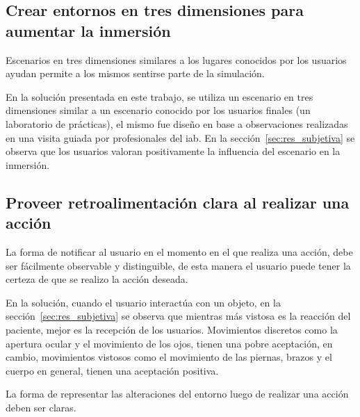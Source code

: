 \subsection{Crear entornos en tres dimensiones para aumentar la inmersión}

Escenarios en tres dimensiones similares a los lugares conocidos por los
usuarios ayudan permite a los mismos sentirse parte de la simulación. 

En la solución presentada en este trabajo, se utiliza un escenario en tres
dimensiones similar a un escenario conocido por los usuarios finales (un
laboratorio de prácticas), el mismo fue diseño en base a observaciones
realizadas en una visita guiada por profesionales del \gls{iab}. En la
sección~\ref{sec:res_subjetiva} se observa que los usuarios valoran
positivamente la influencia del escenario en la inmersión.

\subsection{Proveer retroalimentación clara al realizar una acción}

La forma de notificar al usuario en el momento en el que realiza una acción,
debe ser fácilmente observable y distinguible, de esta manera el usuario puede
tener la certeza de que se realizo la acción deseada.  

En la solución, cuando el usuario interactúa con un objeto, en la
sección~\ref{sec:res_subjetiva} se observa que mientras más vistosa es la
reacción del paciente, mejor es la recepción de los usuarios. Movimientos
discretos como la apertura ocular y el movimiento de los ojos, tienen una pobre
aceptación, en cambio, movimientos vistosos como el movimiento de las piernas,
brazos y el cuerpo en general, tienen una aceptación positiva.

La forma de representar las alteraciones del entorno luego de realizar una
acción deben ser claras.

